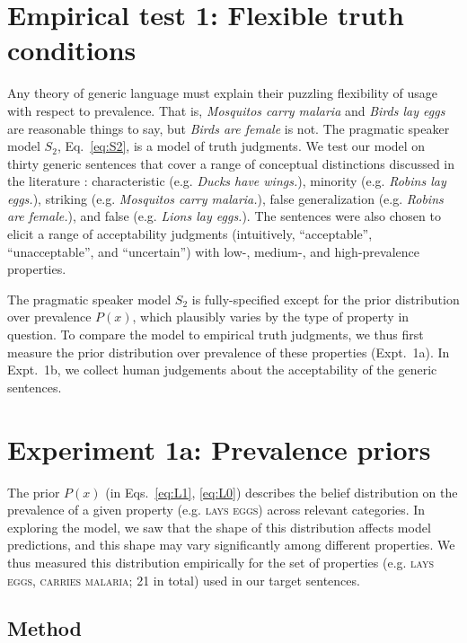 \documentclass[12pt,letterpaper]{article}
\begin{document}
%

\section*{Empirical test 1: Flexible truth conditions}

Any theory of generic language must explain their puzzling flexibility of usage with respect to prevalence.
That is, \emph{Mosquitos carry malaria} and \emph{Birds lay eggs} are reasonable things to say, but \emph{Birds are female} is not.
The pragmatic speaker model $S_2$, Eq.~\ref{eq:S2}, is a model of truth judgments. 
We test our model on thirty generic sentences 
that cover a range of conceptual distinctions discussed in the literature  \cite{Prasada2013}: characteristic (e.g. \emph{Ducks have wings.}), minority (e.g. \emph{Robins lay eggs.}), striking (e.g. \emph{Mosquitos carry malaria.}), false generalization (e.g. \emph{Robins are female.}), and false (e.g. \emph{Lions lay eggs.}).
The sentences were also chosen to elicit a range of acceptability judgments (intuitively, ``acceptable'', ``unacceptable'', and ``uncertain'') with low-, medium-, and high-prevalence properties.

The pragmatic speaker model $S_2$ is fully-specified except for the prior distribution over prevalence $P(x)$, which plausibly varies by the type of property in question.
To compare the model to empirical truth judgments, we thus first measure the prior distribution over prevalence of these properties (Expt.~1a).
In Expt.~1b, we collect human judgements about the acceptability of the generic sentences. 

\section*{Experiment 1a: Prevalence priors}

The prior $P(x)$ (in Eqs.~\ref{eq:L1}, \ref{eq:L0}) describes the belief distribution on the prevalence of a given property (e.g. \textsc{lays eggs}) across relevant categories. 
In exploring the model, we saw that the shape of this distribution affects model predictions, and this shape may vary significantly among different properties.
We thus measured this distribution empirically for the set of properties (e.g. \textsc{lays eggs, carries malaria}; 21 in total) used in our target sentences. 
 
\subsection*{Method}
\end{document}
